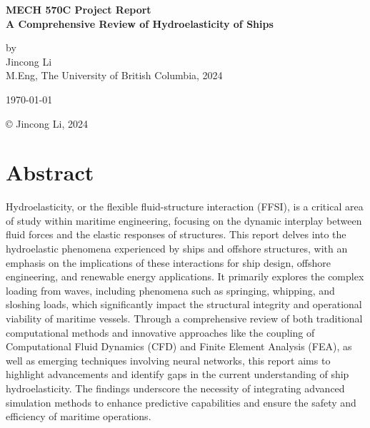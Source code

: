 \documentclass[12pt]{article} %
\begin{document}
\setlength{\parskip}{1em} 
\setlength{\parindent}{0pt}
\newcommand{\vect}[1]{\mathbf{#1}}

\begin{titlepage}  %
    \centering    %

    \vspace*{2cm}
    
    \normalsize \textbf{MECH 570C Project Report} \\
    \vspace{0.5cm}  %
    \normalsize\textbf{A Comprehensive Review of Hydroelasticity of Ships} \\
    \vspace{2cm}  %
    
    \normalsize by\\
    \vspace{1cm}
    \normalsize Jincong Li \\ 
    \vspace{1cm}
    \normalsize M.Eng, The University of British Columbia, 2024
    \vspace{11cm}  %
    
    \normalsize \today

    \vfill  %
    © Jincong Li, 2024
\end{titlepage}
\tableofcontents
\newpage
\section{Abstract}
Hydroelasticity, or the flexible fluid-structure interaction (FFSI), is a critical area of study within maritime engineering, focusing on the dynamic interplay between fluid forces and the elastic responses of structures. This report delves into the hydroelastic phenomena experienced by ships and offshore structures, with an emphasis on the implications of these interactions for ship design, offshore engineering, and renewable energy applications. It primarily explores the complex loading from waves, including phenomena such as springing, whipping, and sloshing loads, which significantly impact the structural integrity and operational viability of maritime vessels. Through a comprehensive review of both traditional computational methods and innovative approaches like the coupling of Computational Fluid Dynamics (CFD) and Finite Element Analysis (FEA), as well as emerging techniques involving neural networks, this report aims to highlight advancements and identify gaps in the current understanding of ship hydroelasticity. The findings underscore the necessity of integrating advanced simulation methods to enhance predictive capabilities and ensure the safety and efficiency of maritime operations.
\end{document}
